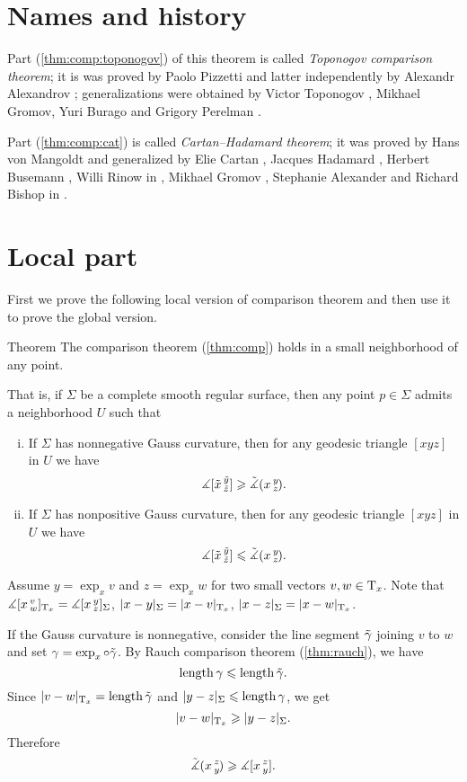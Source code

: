 \section{Names and history}

Part (\ref{thm:comp:toponogov}) of this theorem is called \emph{Toponogov comparison theorem};
it is was proved by Paolo Pizzetti \cite{pizzetti} and latter independently by Alexandr Alexandrov \cite{alexandrov}; generalizations were obtained by  Victor Toponogov \cite{toponogov}, Mikhael Gromov, Yuri Burago and Grigory Perelman \cite{BGP}.

Part (\ref{thm:comp:cat}) is called \emph{Cartan--Hadamard theorem};
it was proved by 
Hans von Mangoldt \cite{mangoldt} and generalized by Elie Cartan \cite{cartan}, Jacques Hadamard \cite{hadamard},
Herbert Busemann \cite{busemann},
Willi Rinow in \cite{rinow},
Mikhael Gromov \cite[p.119]{gromov},
Stephanie Alexander and Richard Bishop in \cite{a-b:h-c}.

\section{Local part}

First we prove the following local version of comparison theorem and then use it to prove the global version.

\begin{thm}{Theorem}
The comparison theorem (\ref{thm:comp}) holds in a small neighborhood of any point.

That is, if $\Sigma$ be a complete smooth regular surface,
then any point $p\in \Sigma$ admits a neighborhood $U$ such that 
\begin{enumerate}[(i)]
 \item If $\Sigma$ has nonnegative Gauss curvature, then for any geodesic triangle $[xyz]$ in $U$ we have
 \[\measuredangle\hinge {\~x}{\~y}{\~z}\ge\angk xyz.\]
 \item If $\Sigma$ has nonpositive Gauss curvature, then for any geodesic triangle $[xyz]$ in $U$ we have
 \[\measuredangle\hinge {\~x}{\~y}{\~z}\le\angk xyz.\]
\end{enumerate}
\end{thm}

Assume $y=\exp_xv$ and $z=\exp_xw$ for two small vectors $v,w\in\T_x$.
Note that $\measuredangle \hinge xvw_{\T_x}=\measuredangle \hinge xyz_\Sigma$,
$|x-y|_\Sigma=|x-v|_{\T_x}$, $|x-z|_\Sigma=|x-w|_{\T_x}$.

If the Gauss curvature is nonnegative,
consider the line segment $\~\gamma$ joining $v$ to $w$ and set $\gamma=\exp_x\circ\~\gamma$.
By Rauch comparison theorem (\ref{thm:rauch}), we have
\[\length\gamma\le \length \~\gamma.\]
Since $|v-w|_{\T_x}=\length\~\gamma$ and $|y-z|_{\Sigma}\le \length\gamma$, we get 
\[|v-w|_{\T_x}\ge |y-z|_\Sigma.\]
Therefore
\[\angk xzy\ge \measuredangle\hinge xzy.\]


